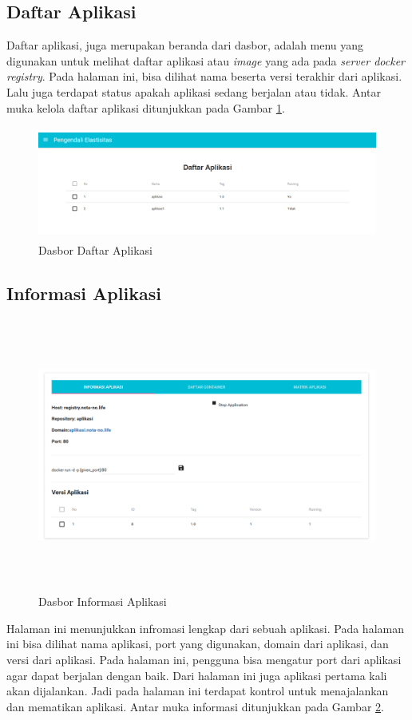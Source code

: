 		\subsection{Daftar Aplikasi}
        	Daftar aplikasi, juga merupakan beranda dari dasbor, adalah menu yang digunakan untuk melihat daftar aplikasi atau \textit{image} yang ada pada \textit{server docker registry}. Pada halaman ini, bisa dilihat nama beserta versi terakhir dari aplikasi. Lalu juga terdapat status apakah aplikasi sedang berjalan atau tidak. Antar muka kelola daftar aplikasi ditunjukkan pada Gambar \ref{ddaftaraplikasi}.
			\begin{figure}[H]
				\centering
				\includegraphics[width=11.2cm,height=3.7cm]{Images/C-4/dasberanda.PNG}
				\caption{Dasbor Daftar Aplikasi}
				\label{ddaftaraplikasi}
			\end{figure}
            
         \subsection{Informasi Aplikasi}
         	\begin{figure}[H]
				\centering
				\includegraphics[width=11.2cm,height=9cm]{Images/C-4/dasinformasi.PNG}
				\caption{Dasbor Informasi Aplikasi}
				\label{dinformasiaplikasi}
			\end{figure}
         	Halaman ini menunjukkan infromasi lengkap dari sebuah aplikasi. Pada halaman ini bisa dilihat nama aplikasi, port yang digunakan, domain dari aplikasi, dan versi dari aplikasi. Pada halaman ini, pengguna bisa mengatur port dari aplikasi agar dapat berjalan dengan baik. Dari halaman ini juga aplikasi pertama kali akan dijalankan. Jadi pada halaman ini terdapat kontrol untuk menajalankan dan mematikan aplikasi. Antar muka informasi ditunjukkan pada Gambar \ref{dinformasiaplikasi}.
            
